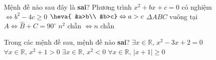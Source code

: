 \begin{ex}%
	Mệnh đề nào sau đây là \textbf{sai}?
	\choice
	{Phương trình $ x^2+bx+c=0$ có nghiệm $\Leftrightarrow b^2-4c\geqslant 0$}
	{\True $\heva{
			&a>b\\
			&b>c} \Leftrightarrow a>c$}
	{$\Delta ABC$ vuông tại $A\Leftrightarrow \widehat{B}+\widehat{C}=90^\circ$}
	{ $ n^2$ chẵn $\Leftrightarrow n$ chẵn}
\end{ex}
\begin{ex}%
	Trong các mệnh đề sau, mệnh đề nào \textbf{sai}?
	\choice
	{$\exists x\in \mathbb{R},\,x^2-3x+2=0$}
	{$\forall x\in \mathbb{R},\,x^2+1>0$}
	{\True $\exists x\in \mathbb{R},\,x^2<0$}
	{$\forall x\in \mathbb{R},\,|x+1|\ge 0$}
\end{ex}

